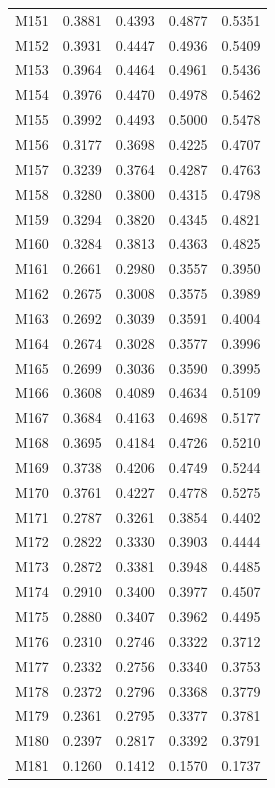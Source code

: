\begin{longtable}{lrrrr}
M151 & 0.3881 & 0.4393 & 0.4877 & 0.5351 \\
M152 & 0.3931 & 0.4447 & 0.4936 & 0.5409 \\
M153 & 0.3964 & 0.4464 & 0.4961 & 0.5436 \\
M154 & 0.3976 & 0.4470 & 0.4978 & 0.5462 \\
M155 & 0.3992 & 0.4493 & 0.5000 & 0.5478 \\
M156 & 0.3177 & 0.3698 & 0.4225 & 0.4707 \\
M157 & 0.3239 & 0.3764 & 0.4287 & 0.4763 \\
M158 & 0.3280 & 0.3800 & 0.4315 & 0.4798 \\
M159 & 0.3294 & 0.3820 & 0.4345 & 0.4821 \\
M160 & 0.3284 & 0.3813 & 0.4363 & 0.4825 \\
M161 & 0.2661 & 0.2980 & 0.3557 & 0.3950 \\
M162 & 0.2675 & 0.3008 & 0.3575 & 0.3989 \\
M163 & 0.2692 & 0.3039 & 0.3591 & 0.4004 \\
M164 & 0.2674 & 0.3028 & 0.3577 & 0.3996 \\
M165 & 0.2699 & 0.3036 & 0.3590 & 0.3995 \\
M166 & 0.3608 & 0.4089 & 0.4634 & 0.5109 \\
M167 & 0.3684 & 0.4163 & 0.4698 & 0.5177 \\
M168 & 0.3695 & 0.4184 & 0.4726 & 0.5210 \\
M169 & 0.3738 & 0.4206 & 0.4749 & 0.5244 \\
M170 & 0.3761 & 0.4227 & 0.4778 & 0.5275 \\
M171 & 0.2787 & 0.3261 & 0.3854 & 0.4402 \\
M172 & 0.2822 & 0.3330 & 0.3903 & 0.4444 \\
M173 & 0.2872 & 0.3381 & 0.3948 & 0.4485 \\
M174 & 0.2910 & 0.3400 & 0.3977 & 0.4507 \\
M175 & 0.2880 & 0.3407 & 0.3962 & 0.4495 \\
M176 & 0.2310 & 0.2746 & 0.3322 & 0.3712 \\
M177 & 0.2332 & 0.2756 & 0.3340 & 0.3753 \\
M178 & 0.2372 & 0.2796 & 0.3368 & 0.3779 \\
M179 & 0.2361 & 0.2795 & 0.3377 & 0.3781 \\
M180 & 0.2397 & 0.2817 & 0.3392 & 0.3791 \\
M181 & 0.1260 & 0.1412 & 0.1570 & 0.1737 \\

\end{longtable}
